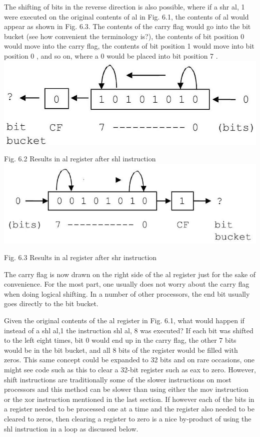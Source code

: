 \documentclass[10pt]{article}
\begin{document}
The shifting of bits in the reverse direction is also possible, where if a shr al, 1 were executed on the original contents of al in Fig. 6.1, the contents of al would appear as shown in Fig. 6.3. The contents of the carry flag would go into the bit bucket (see how convenient the terminology is?), the contents of bit position 0 would move into the carry flag, the contents of bit position 1 would move into bit position 0 , and so on, where a 0 would be placed into bit position 7 .\\
\includegraphics[max width=\textwidth, center]{2025_03_24_ebe50cc223a6fbc49eecg-116(1)}

Fig. 6.2 Results in al register after shl instruction\\
\includegraphics[max width=\textwidth, center]{2025_03_24_ebe50cc223a6fbc49eecg-117}

Fig. 6.3 Results in al register after shr instruction

The carry flag is now drawn on the right side of the al register just for the sake of convenience. For the most part, one usually does not worry about the carry flag when doing logical shifting. In a number of other processors, the end bit usually goes directly to the bit bucket.

Given the original contents of the al register in Fig. 6.1, what would happen if instead of a shl al,1 the instruction shl al, 8 was executed? If each bit was shifted to the left eight times, bit 0 would end up in the carry flag, the other 7 bits would be in the bit bucket, and all 8 bits of the register would be filled with zeros. This same concept could be expanded to 32 bits and on rare occasions, one might see code such as this to clear a 32-bit register such as eax to zero. However, shift instructions are traditionally some of the slower instructions on most processors and this method can be slower than using either the mov instruction or the xor instruction mentioned in the last section. If however each of the bits in a register needed to be processed one at a time and the register also needed to be cleared to zeros, then clearing a register to zero is a nice by-product of using the shl instruction in a loop as discussed below.
\end{document}
